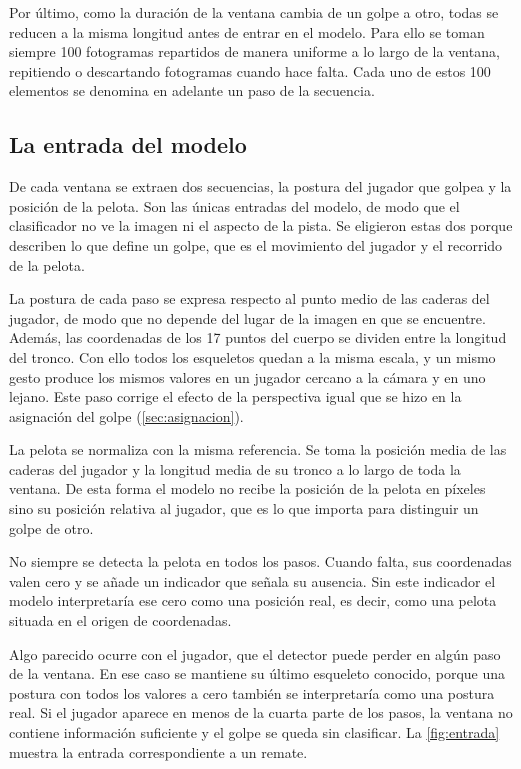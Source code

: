 Por último, como la duración de la ventana cambia de un golpe a otro, todas se reducen a la misma longitud antes de entrar en el modelo.
Para ello se toman siempre 100 fotogramas repartidos de manera uniforme a lo largo de la ventana, repitiendo o descartando fotogramas cuando hace falta.
Cada uno de estos 100 elementos se denomina en adelante un paso de la secuencia.

\subsection{La entrada del modelo}
\label{sec:entrada-modelo}

De cada ventana se extraen dos secuencias, la postura del jugador que golpea y la posición de la pelota.
Son las únicas entradas del modelo, de modo que el clasificador no ve la imagen ni el aspecto de la pista.
Se eligieron estas dos porque describen lo que define un golpe, que es el movimiento del jugador y el recorrido de la pelota.

La postura de cada paso se expresa respecto al punto medio de las caderas del jugador, de modo que no depende del lugar de la imagen en que se encuentre.
Además, las coordenadas de los 17 puntos del cuerpo se dividen entre la longitud del tronco.
Con ello todos los esqueletos quedan a la misma escala, y un mismo gesto produce los mismos valores en un jugador cercano a la cámara y en uno lejano.
Este paso corrige el efecto de la perspectiva igual que se hizo en la asignación del golpe (\cref{sec:asignacion}).

La pelota se normaliza con la misma referencia.
Se toma la posición media de las caderas del jugador y la longitud media de su tronco a lo largo de toda la ventana.
De esta forma el modelo no recibe la posición de la pelota en píxeles sino su posición relativa al jugador, que es lo que importa para distinguir un golpe de otro.

No siempre se detecta la pelota en todos los pasos.
Cuando falta, sus coordenadas valen cero y se añade un indicador que señala su ausencia.
Sin este indicador el modelo interpretaría ese cero como una posición real, es decir, como una pelota situada en el origen de coordenadas.

Algo parecido ocurre con el jugador, que el detector puede perder en algún paso de la ventana.
En ese caso se mantiene su último esqueleto conocido, porque una postura con todos los valores a cero también se interpretaría como una postura real.
Si el jugador aparece en menos de la cuarta parte de los pasos, la ventana no contiene información suficiente y el golpe se queda sin clasificar.
La \cref{fig:entrada} muestra la entrada correspondiente a un remate.

